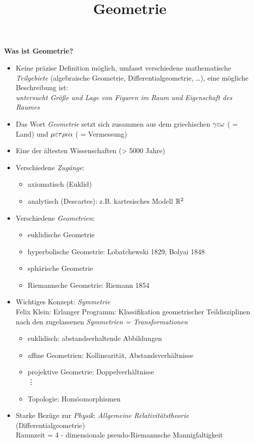 \documentclass[11pt]{scrbook}
\title{Geometrie}
\author{}
\begin{document}
\maketitle

\tableofcontents
\newpage

\textbf{Was ist Geometrie?}
\begin{itemize}
	\item
		Keine präzise Definition möglich, umfasst verschiedene mathematische \emph{Teilgebiete} (algebraische Geometrie, Differentialgeometrie, \dots ), eine mögliche Beschreibung ist: \\
		\emph{untersucht Größe und Lage von Figuren im Raum und Eigenschaft des Raumes}
	\item
		Das Wort \emph{Geometrie}  setzt sich zusammen aus dem griechischen $ \gamma \varepsilon \omega $ ( = Land) und $ \mu \varepsilon \tau \rho \iota \alpha$ ( = Vermessung)
	\item
		Eine der ältesten Wissenschaften (> 5000 Jahre)
	\item
		Verschiedene \emph{Zugänge}: 
		\begin{itemize}
			\item axiomatisch (Euklid)
			\item analytisch (Descartes): z.B. kartesisches Modell $\mathbb{R}^2$
		\end{itemize}
	\item
		Verschiedene \emph{Geometrien}:
		\begin{itemize}
			\item euklidische Geometrie
			\item hyperbolische Geometrie: Lobatchewski 1829, Bolyai 1848
			\item sphärische Geometrie
			\item Riemannsche Geometrie: Riemann 1854
		\end{itemize}
	\item 
		Wichtiges Konzept: \emph{Symmetrie} \\
		Felix Klein: Erlanger Programm: Klassifikation geometrischer Teildisziplinen nach den zugelassenen \emph{Symmetrien = Transformationen}
		\begin{itemize}
			\item euklidisch: abstandserhaltende Abbildungen
			\item affine Geometrien: Kollinearität, Abstandsverhältnisse
			\item projektive Geometrie: Doppelverhältnisse \\
				 \vdots
			\item Topologie: Homöomorphismen
		\end{itemize}
	\item
		Starke Bezüge zur \emph{Physik}: \emph{Allgemeine Relativitätstheorie} (Differentialgeometrie) \\
		Raumzeit = 4 - dimensionale pseudo-Riemannsche Mannigfaltigkeit
\end{itemize}
\end{document}
